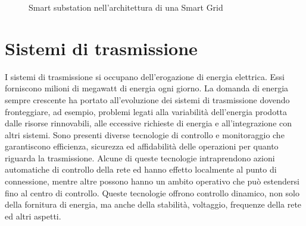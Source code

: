 \begin{figure}[h] 
\caption{Smart substation nell'architettura di una Smart Grid}\label{fig:29}
\end{figure}


\section{Sistemi di trasmissione}
I sistemi di trasmissione si occupano dell'erogazione di energia elettrica. Essi forniscono milioni di megawatt di energia ogni giorno. La domanda di energia sempre crescente ha portato all'evoluzione dei sistemi di trasmissione  dovendo fronteggiare, ad esempio, problemi legati alla variabilità dell'energia prodotta dalle risorse rinnovabili, alle eccessive richieste di energia e all'integrazione con altri sistemi. Sono presenti diverse tecnologie di controllo e monitoraggio che garantiscono efficienza, sicurezza ed affidabilità delle operazioni per quanto riguarda la trasmissione. Alcune di queste tecnologie intraprendono azioni automatiche di controllo della rete ed hanno effetto localmente al punto di connessione, mentre altre possono hanno un ambito operativo che può estendersi fino al centro di controllo. Queste tecnologie offrono controllo dinamico, non solo della fornitura di energia, ma anche della stabilità, voltaggio, frequenze della rete ed altri aspetti.


